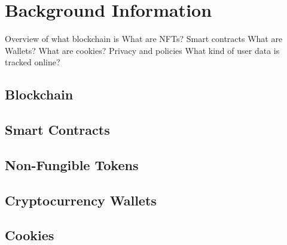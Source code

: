 \chapter{Background Information}
\label{ch:background}


Overview of what blockchain is
What are NFTs?
Smart contracts
What are Wallets?
What are cookies?
Privacy and policies
What kind of user data is tracked online? 



%
%
\section{Blockchain}
\label{sec:background:blockchain}


%
%
\section{Smart Contracts}
\label{sec:background:smartcontracts}


%
%
\section{Non-Fungible Tokens}
\label{sec:background:nfts}


%
%
\section{Cryptocurrency Wallets}
\label{sec:background:wallets}


%
%
\section{Cookies}
\label{sec:background:cookies}




